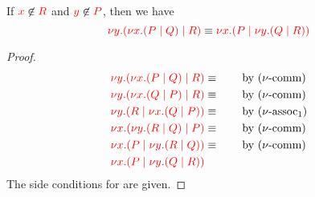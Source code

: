 \begin{lemma}[\cpEquivCutAssNoParen2]\label{thm:cp-cut-assoc2}
  If $\textcolor{red}{x}\not\in\textcolor{red}{R}$ and $\textcolor{red}{y}\not\in\textcolor{red}{P}$, then we have
  \[
    \textcolor{red}{\nu y.(\nu x.(P \mid Q) \mid R)} \equiv
    \textcolor{red}{\nu x.(P \mid \nu y.(Q \mid R))}
  \]
\end{lemma}
\begin{proof}
  \begin{align*}
    \textcolor{red}{\nu y.(\nu x.(P \mid Q) \mid R)} &\equiv \qquad \text{by \ensuremath{(\nu\text{-comm})}} \\
    \textcolor{red}{\nu y.(\nu x.(Q \mid P) \mid R)} &\equiv \qquad \text{by \ensuremath{(\nu\text{-comm})}} \\
    \textcolor{red}{\nu y.(R \mid \nu x.(Q \mid P))} &\equiv \qquad \text{by \ensuremath{(\nu\text{-assoc}_{1})}} \\
    \textcolor{red}{\nu x.(\nu y.(R \mid Q) \mid P)} &\equiv \qquad \text{by \ensuremath{(\nu\text{-comm})}} \\
    \textcolor{red}{\nu x.(P \mid \nu y.(R \mid Q))} &\equiv \qquad \text{by \ensuremath{(\nu\text{-comm})}} \\
    \textcolor{red}{\nu x.(P \mid \nu y.(Q \mid R))}
  \end{align*}
  The side conditions for  are given.
\end{proof}
